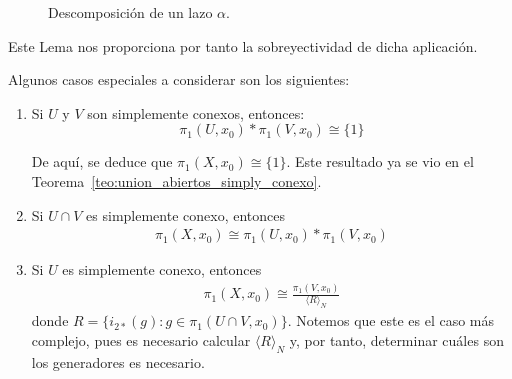 \begin{figure}[ht]
    \caption{Descomposición de un lazo $\alpha$.}
    \label{fig:descomposicion_lazos2}
\end{figure}

Este Lema nos proporciona por tanto la sobreyectividad de dicha aplicación.
\begin{observacion}
    Algunos casos especiales a considerar son los siguientes:
    \begin{enumerate}
        \item Si $U$ y $V$ son simplemente conexos, entonces:
        \begin{equation*}
            \pi_1(U,x_0)\ast \pi_1(V,x_0) \cong \{1\}
        \end{equation*}

        De aquí, se deduce que $\pi_1(X,x_0) \cong \{1\}$. Este resultado ya se vio en el Teorema~\ref{teo:union_abiertos_simply_conexo}.


        \item Si $U\cap V$ es simplemente conexo, entonces
        \begin{gather*}
            \pi_1(X,x_0) \cong \pi_1(U,x_0) \ast \pi_1(V,x_0)
        \end{gather*}

        \item Si $U$ es simplemente conexo, entonces 
        \begin{gather*}
            \pi_1(X,x_0) \cong \frac{\pi_1(V,x_0)}{\langle R \rangle_N}
        \end{gather*}
        donde $R=\{i_{2*}(g) : g\in \pi_1(U\cap V, x_0)\}$. Notemos que este es el caso más complejo, pues es necesario calcular $\langle R \rangle_N$ y, por tanto, determinar cuáles son los generadores es necesario.
    \end{enumerate}
\end{observacion}

